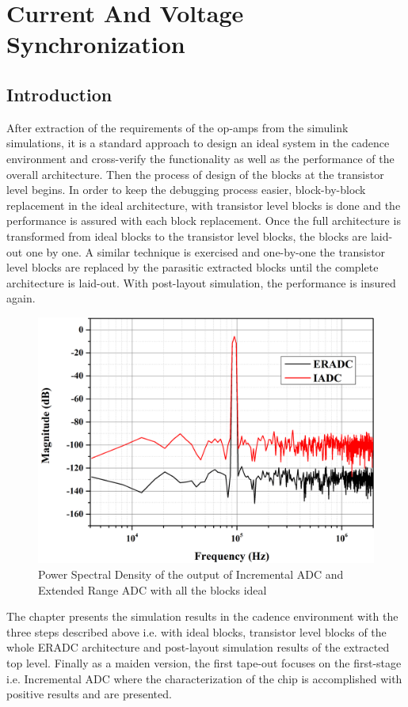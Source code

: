 \chapter{Current And Voltage Synchronization}

\section{Introduction}
After extraction of the requirements of the op-amps from the simulink simulations, it is a standard approach to design an ideal system in the cadence environment and cross-verify the functionality as well as the performance of the overall architecture. Then the process of design of the blocks at the transistor level begins. In order to keep the debugging process easier, block-by-block replacement in the ideal architecture, with transistor level blocks is done and the performance is assured with each block replacement. Once the full architecture is transformed from ideal blocks to the transistor level blocks, the blocks are laid-out one by one. A similar technique is exercised and one-by-one the transistor level blocks are replaced by the parasitic extracted blocks until the  complete architecture is laid-out. With post-layout simulation, the performance is insured again. 
%
\begin{figure}[h!]
    \centering
    \includegraphics[width=0.8\columnwidth]{Chap06/Figures/PSD_ideal.jpg}
    \caption{Power Spectral Density of the output of Incremental ADC and Extended Range ADC with all the blocks ideal}
    \label{fig:psd_eradc_ideal}
\end{figure}
%

The chapter presents the simulation results in the cadence environment with the three steps described above i.e. with ideal blocks, transistor level blocks of the whole ERADC architecture and post-layout simulation results of the extracted top level. Finally as a maiden version, the first tape-out focuses on the first-stage i.e. Incremental ADC where the characterization of the chip is accomplished with positive results and are presented.

